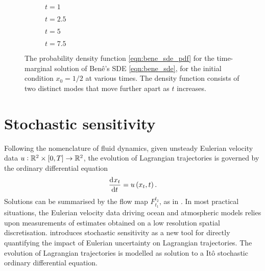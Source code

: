 \begin{figure}
	\begin{center}
		\begin{subfigure}{0.49\textwidth}
			\caption{\(t = 1\)}
			\label{fig:bene_1}
		\end{subfigure}
		\begin{subfigure}{0.49\textwidth}
			\caption{\(t = 2.5\)}
			\label{fig:bene_2.5}
		\end{subfigure}
		\begin{subfigure}{0.49\textwidth}
			\caption{\(t = 5\)}
			\label{fig:bene_5}
		\end{subfigure}
		\begin{subfigure}{0.49\textwidth}
			\caption{\(t = 7.5\)}
			\label{fig:bene_7.5}
		\end{subfigure}
	\end{center}
	\caption{The probability density function \eqref{eqn:bene_sde_pdf} for the time-marginal solution of Ben\^e's SDE \eqref{eqn:bene_sde}, for the initial condition \(x_0 = 1/2\) at various times.
		The density function consists of two distinct modes that move further apart as \(t\) increases.}
	\label{fig:bene_pdf}
\end{figure}


\section{Stochastic sensitivity}

Following the nomenclature of fluid dynamics, given unsteady Eulerian velocity data \(u: \mathbb{R}^2 \times [0,T] \to \mathbb{R}^2\), the evolution of Lagrangian trajectories is governed by the ordinary differential equation
\[
	\dod{x_t}{t} = u\left(x_t, t\right).
\]
Solutions can be summarised by the flow map \(F_{t_1}^{t_2}\), as in .
In most practical situations, the Eulerian velocity data driving ocean and atmospheric models relies upon measurements of estimates obtained on a low resolution spatial discretisation.
\citet{Balasuriya_2020_StochasticSensitivityComputable} introduces stochastic sensitivity as a new tool for directly quantifying the impact of Eulerian uncertainty on Lagrangian trajectories.
The evolution of Lagrangian trajectories is modelled as solution to a It\^o stochastic ordinary differential equation.

